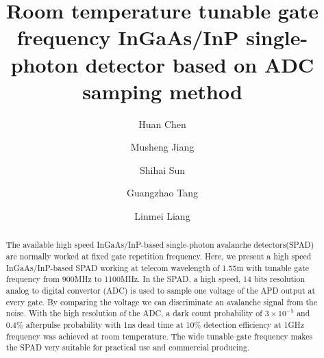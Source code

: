 \documentclass[%
 reprint,
superscriptaddress,
 amsmath,amssymb,
 aps,
]{revtex4-1}
\begin{document}
%

\title{Room temperature tunable gate frequency InGaAs/InP single-photon detector based on ADC samping method   }%
\author{Huan Chen}
%
 \author{Musheng Jiang}%
  \author{Shihai Sun}
   \author{Guangzhao Tang}
    \author{Linmei Liang}%

\begin{abstract}
The available high speed InGaAs/InP-based single-photon avalanche detectors(SPAD) are normally worked at fixed gate repetition frequency. Here, we present a high speed InGaAs/InP-based SPAD working at telecom wavelength of 1.55\textmu m with tunable gate frequency from 900MHz to 1100MHz. In the SPAD, a high speed, 14 bits resolution analog to digital convertor (ADC) is used to sample one voltage of the APD output at every gate. By comparing the voltage we can discriminate an avalanche signal from the noise. With the high resolution of the ADC, a dark count probability of $3 \times 10^{-5}$ and 0.4\% afterpulse probability with 1ns dead time at 10\% detection efficiency at 1GHz frequency was achieved at room temperature. The wide tunable gate frequency makes the SPAD very suitable for practical use and commercial producing.
\end{abstract}

\maketitle
\end{document}
